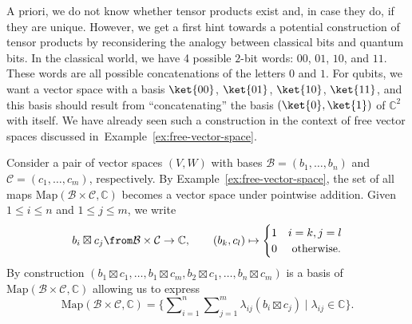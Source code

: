 \documentclass[a4paper,oneside, 12pt]{amsart}
\begin{document}
A priori, we do not know whether tensor products exist and, in case they do, if they are unique.
However, we get a first hint towards a potential construction of tensor products by reconsidering the analogy between classical bits and quantum bits.
In the classical world, we have 4 possible \(2\)-bit words: \(00\), \(01\), \(10\), and  \(11\).
These words are all possible concatenations of the letters \(0\) and \(1\).
For qubits, we want a vector space with a basis \(\ket{00}\), \(\ket{01}\), \(\ket{10}\), \(\ket{11}\), and this basis should result from ``concatenating'' the basis \((\ket{0}, \ket{1})\) of \( \mathbb{C}^{2}\) with itself.
We have already seen such a construction  in the context of free vector spaces discussed in~Example~\ref{ex:free-vector-space}.

\begin{remark}\label{rmk:realisation-of-tensor-products}
  Consider a  pair of vector spaces \((V,W)\) with bases \(\mathcal{B}= (b_{1}, \dots , b_{n})\) and \(\mathcal{C}= (c_{1}, \dots , c_{m})\), respectively.
  By Example~\ref{ex:free-vector-space}, the set of all maps \(\mathrm{Map}(\mathcal{B}\times \mathcal{C}, \mathbb{C})\) becomes a vector space under pointwise addition.
  Given \(1\leq i \leq n\) and \(1 \leq j \leq m\), we write
  \begin{equation*}
    b_{i} \boxtimes c_{j} \from \mathcal{B} \times \mathcal{C} \to \mathbb{C}, \qquad (b_{k}, c_{l}) \mapsto
    \begin{cases}
      1 & i=k, j= l \\
      0 & \text{ otherwise.}
    \end{cases}
  \end{equation*}
  By construction \((b_{1}\boxtimes c_{1}, \dots , b_{1}\boxtimes c_{m}, b_{2} \boxtimes c_{1}, \dots , b_{n} \boxtimes c_{m})\) is a basis of \(\mathrm{Map}(\mathcal{B}\times \mathcal{C}, \mathbb{C})\) allowing us to express
  \begin{equation*}
    \mathrm{Map}(\mathcal{B}\times \mathcal{C}, \mathbb{C}) =  \big\{ \sum\nolimits_{i=1}^{n}\sum\nolimits_{j=1}^{m}\lambda_{ij}(b_{i}\boxtimes c_{j})\mid \lambda_{ij} \in \mathbb{C}\big\}.
  \end{equation*}
\end{remark}
\end{document}
